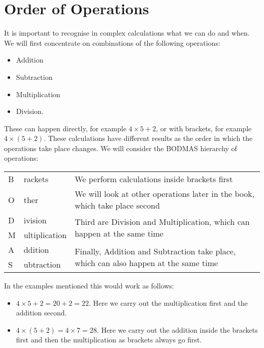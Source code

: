\documentclass[11pt, oneside]{article}
\theoremstyle{definition}
\begin{document}
\section{Order of Operations}

It is important to recognise in complex calculations what we can do and when. We will first concentrate on combinations of the following operations:

\begin{itemize}
\item Addition
\item Subtraction
\item Multiplication
\item Division.
\end{itemize}

These can happen directly, for example $4\times 5 + 2$, or with brackets, for example $4\times (5 + 2)$. These calculations have different results as the order in which the operations take place changes. We will consider the BODMAS hierarchy of operations:

\begin{table}[H]
\begin{tabular}{p{0.3cm}p{2.5cm}p{9cm}}
B & rackets       & We perform calculations inside brackets first                            \\
O & ther          & We will look at other operations later in the book, which take place second                                  \\
D & ivision       & \multirow{2}{*}{Third are Division and Multiplication, which can happen at the same time} \\
M & ultiplication &                                                                          \\
A & ddition       & \multirow{2}{*}{Finally, Addition and Subtraction take place, which can also happen at the same time}    \\
S & ubtraction    &                                                                         
\end{tabular}
\end{table}

In the examples mentioned this would work as follows:

\begin{itemize}
\item $4\times 5 + 2 = 20 + 2 = 22$.
Here we carry out the multiplication first and the addition second.

\item $4\times (5 + 2) = 4\times 7 = 28$.
Here we carry out the addition inside the brackets first and then the multiplication as brackets always go first.
\end{itemize}
\end{document}
